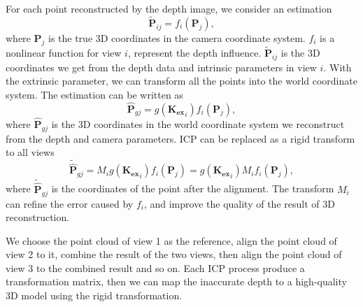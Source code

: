 For each point reconstructed by the depth image, we consider an estimation
\begin{equation}
\mathbf{\tilde{P}}_{ij}=f_{i}(\mathbf{P}_{j}),
\end{equation}
where $\mathbf{P}_{j}$ is the true 3D coordinates in the camera coordinate system. $f_{i}$ is a nonlinear function for view $i$, represent the depth influence. $\mathbf{\tilde{P}}_{ij}$ is the 3D coordinates we get from the depth data and intrinsic parameters in view $i$. With the extrinsic parameter, we can transform all the points into the world coordinate system. The estimation can be written as
\begin{equation}
\mathbf{\hat{P}}_{gj}=g(\mathbf{K_{ex}}_{i})f_{i}(\mathbf{P}_{j}),
\end{equation}
where $\mathbf{\hat{P}}_{gj}$ is the 3D coordinates in the world coordinate system we reconstruct from the depth and camera parameters. ICP can be replaced as a rigid transform to all views
\begin{equation}
\mathbf{\tilde{\hat{P}}}_{gj}=M_{i}g(\mathbf{K_{ex}}_{i})f_{i}(\mathbf{P}_{j})=g(\mathbf{K_{ex}}_{i})M_{i}f_{i}(\mathbf{P}_{j}),
\end{equation}
where $\mathbf{\tilde{\hat{P}}}_{gj}$ is the coordinates of the point after the alignment. The transform $M_{i}$ can refine the error caused by $f_{i}$, and improve the quality of the result of 3D reconstruction.

We choose the point cloud of view 1 as the reference, align the point cloud of view 2 to it, combine the result of the two views, then align the point cloud of view 3 to the combined result and so on. Each ICP process produce a transformation matrix, then we can map the inaccurate depth to a high-quality 3D model using the rigid transformation.




